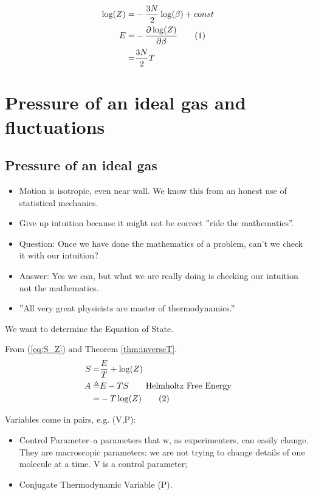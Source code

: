 \documentclass[]{article}
\newcommand\numberthis{\addtocounter{equation}{1}\tag{\theequation}}
\begin{document}
\begin{align*}
\log(Z) =& - \frac{3N}{2} \log(\beta) + const\\
E =& - \frac{\partial \log(Z)}{\partial \beta}\numberthis \label{eq:E:Z}\\
=& \frac{3N}{2} T
\end{align*}


\section{Pressure of an ideal gas and fluctuations}

\subsection{Pressure of an ideal gas}

\begin{itemize}
	\item Motion is isotropic, even near wall. We know this from an honest use of statistical mechanics.
	\item Give up intuition because it might not be correct ''ride the mathematics''.
	\item Question: Once we have done the mathematics of a problem, can’t we check it with our intuition?
	\item Answer: Yes we can, but what we are really doing is checking our intuition not the mathematics.
	\item ''All very great physicists are master of thermodynamics.''
\end{itemize}

We want to determine the Equation of State.

From (\ref{eq:S_Z}) and Theorem \ref{thm:inverseT}.
\begin{align*}
S =& \frac{E}{T} + \log(Z)\\
A\triangleq &E - TS\tag*{Helmholtz Free Energy} \\
=& -T \log(Z) \numberthis \label{eq:helmholtz}
\end{align*}



Variables come in pairs, e.g. (V,P):
\begin{itemize}
	\item Control Parameter--a parameters that w, as experimenters, can easily change. They are macroscopic parameters: we are not trying to change details of one molecule at a time. V is a control parameter;
	\item Conjugate Thermodynamic Variable (P).
\end{itemize}
\end{document}
